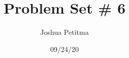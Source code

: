\documentclass[11pt]{article}
\title{Problem Set \# 6}
\author{Joshua Petitma}
\date{09/24/20}
\begin{document}
    \maketitle
    \section[Question 1]{}
    \subsection[1a]{}
    \subsection[1b]{}
    \section[Question 2]{}
    \subsection[2a]{}
\end{document}
